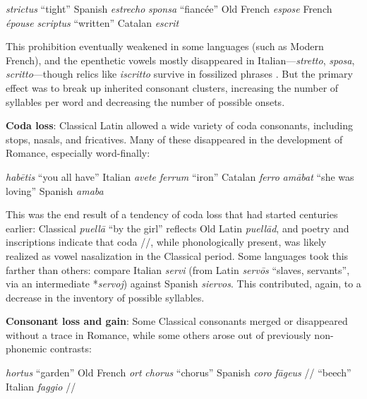 \documentclass[12pt,twoside]{article}
\newcommand{\ipa}[1]{/\textipa{#1}/}
\newcommand{\yields}{\textrightarrow}
\begin{document}
\begin{exe}
\ex \emph{strictus} ``tight'' \yields{} Spanish \emph{estrecho}
\ex \emph{sponsa} ``fiancée'' \yields{} Old French \emph{espose} \yields{} French \emph{épouse}
\ex \emph{scriptus} ``written'' \yields{} Catalan \emph{escrit}
\end{exe}

This prohibition eventually weakened in some languages (such as Modern French), and the epenthetic vowels mostly disappeared in Italian---\emph{stretto}, \emph{sposa}, \emph{scritto}---though relics like \emph{iscritto} survive in fossilized phrases \citep{alkire}. But the primary effect was to break up inherited consonant clusters, increasing the number of syllables per word and decreasing the number of possible onsets.

\textbf{Coda loss}: Classical Latin allowed a wide variety of coda consonants, including stops, nasals, and fricatives. Many of these disappeared in the development of Romance, especially word-finally:

\begin{exe}
\ex \emph{hab\=etis} ``you all have'' \yields{} Italian \emph{avete}
\ex \emph{ferrum} ``iron'' \yields{} Catalan \emph{ferro}
\ex \emph{am\=abat} ``she was loving'' \yields{} Spanish \emph{amaba}
\end{exe}

This was the end result of a tendency of coda loss that had started centuries earlier: Classical \emph{puell\=a} ``by the girl'' reflects Old Latin \emph{puell\=ad}, and poetry and inscriptions indicate that coda \ipa{m}, while phonologically present, was likely realized as vowel nasalization in the Classical period. Some languages took this farther than others: compare Italian \emph{servi} (from Latin \emph{serv\=os} ``slaves, servants'', via an intermediate *\emph{servoj}) against Spanish \emph{siervos}. This contributed, again, to a decrease in the inventory of possible syllables.

\textbf{Consonant loss and gain}: Some Classical consonants merged or disappeared without a trace in Romance, while some others arose out of previously non-phonemic contrasts:

\begin{exe}
\ex \emph{hortus} ``garden'' \yields{} Old French \emph{ort}
\ex \emph{chorus} ``chorus'' \yields{} Spanish \emph{coro}
\ex \emph{f\=ageus} \ipa{fa:geus} ``beech'' \yields{} Italian \emph{faggio} \ipa{faddZo}
\end{exe}
\end{document}
